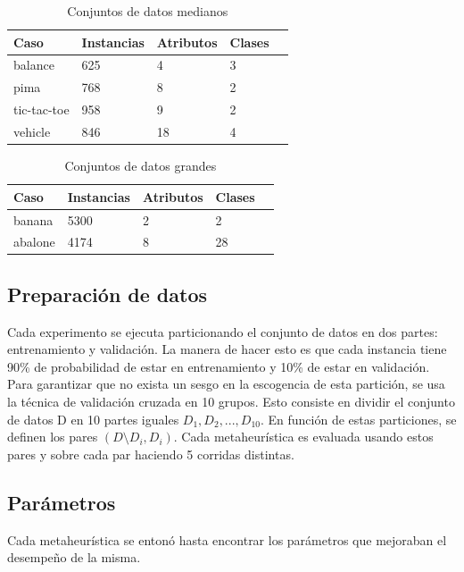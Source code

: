 \documentclass[11pt]{article}
\begin{document}
\begin{table}[h]
\begin{tabular}{ |l|l|l|l|l| }
    \hline
    Caso    & Instancias & Atributos & Clases \\ \hline
    balance & 625  & 4 &  3 \\ \hline
    pima & 768  & 8 &  2 \\ \hline
    tic-tac-toe & 958  & 9 &  2 \\ \hline
    vehicle & 846  & 18 &  4 \\ \hline
\end{tabular}
\caption{Conjuntos de datos medianos}
\label{tabla:1}
\end{table}

\begin{table}[h]
\begin{tabular}{ |l|l|l|l|l| }
    \hline
    Caso    & Instancias & Atributos & Clases \\ \hline
    banana & 5300  & 2 &  2 \\ \hline
    abalone & 4174  & 8 &  28 \\ \hline
\end{tabular}
\caption{Conjuntos de datos grandes}
\label{tabla:1}
\end{table}

\subsection{Preparación de datos}

Cada experimento se ejecuta particionando el conjunto de datos en dos partes: entrenamiento y validación. La manera de hacer esto es que cada instancia tiene 90\% de probabilidad de estar en entrenamiento y 10\% de estar en validación. Para garantizar que no exista un sesgo en la escogencia de esta partición, se usa la técnica de validación cruzada en 10 grupos. Esto consiste en dividir el conjunto de datos D en 10 partes iguales $D_1, D_2, ..., D_{10}$. En función de estas particiones, se definen los pares $(D \setminus D_i, D_i)$. Cada metaheurística es evaluada usando estos pares y sobre cada par haciendo 5 corridas distintas.


\subsection{Parámetros}

Cada metaheurística se entonó hasta encontrar los parámetros que mejoraban el desempeño de la misma.
\end{document}
